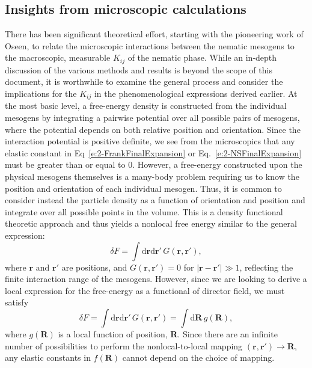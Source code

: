 \subsection{Insights from microscopic calculations}
There has been significant theoretical effort, starting with the pioneering work of Oseen, to relate the microscopic interactions between the nematic mesogens to the macroscopic, measurable $K_{ij}$ of the nematic phase.
While an in-depth discussion of the various methods and results is beyond the scope of this document, it is worthwhile to examine the general process and consider the implications for the $K_{ij}$ in the phenomenological expressions derived earlier.
At the most basic level, a free-energy density is constructed from the individual mesogens by integrating a pairwise potential over all possible pairs of mesogens, where the potential depends on both relative position and orientation.
Since the interaction potential is positive definite, we see from the microscopics that any elastic constant in Eq~\ref{e:2-FrankFinalExpansion} or Eq.~\ref{e:2-NSFinalExpansion} must be greater than or equal to 0.
However, a free-energy constructed upon the physical mesogens themselves is a many-body problem requiring us to know the position and orientation of each individual mesogen.
Thus, it is common to consider instead the particle density as a function of orientation and position and integrate over all possible points in the volume.
This is a density functional theoretic approach and thus yields a nonlocal free energy similar to the general expression:
\begin{equation}
  \delta F = \int \textrm{d}\mathbf{r} \textrm{d}\mathbf{r}' \, G(\mathbf{r},\mathbf{r}'),
\end{equation}
where $\mathbf{r}$ and $\mathbf{r}'$ are positions, and $G(\mathbf{r},\mathbf{r}') = 0$ for $|\mathbf{r}-\mathbf{r}'| \gg 1$, reflecting the finite interaction range of the mesogens.
However, since we are looking to derive a local expression for the free-energy as a functional of director field, we must satisfy
\begin{equation}
  \delta F = \int \textrm{d}\mathbf{r} \textrm{d}\mathbf{r}' \, G(\mathbf{r},\mathbf{r}')
  = \int \textrm{d} \mathbf{R} \, g(\mathbf{R}),\label{e:2-NonlocalLocal}
\end{equation}
where $g(\mathbf{R})$ is a local function of position, $\mathbf{R}$.
Since there are an infinite number of possibilities to perform the nonlocal-to-local mapping $(\mathbf{r},\mathbf{r}') \rightarrow \mathbf{R}$, any elastic constants in $f(\mathbf{R})$ cannot depend on the choice of mapping.
